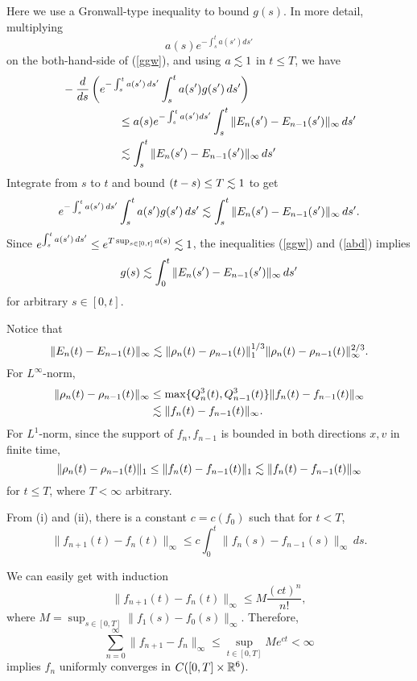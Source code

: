\documentclass[11pt]{amsart}
\begin{document}
\begin{pfs}
Here we use a Gronwall-type inequality to bound $g(s)$.
In more detail, multiplying
\[a(s)e^{-\int_s^ta(s')ds'}\]
on the both-hand-side of (\ref{ggw}), and using $a\lesssim 1$ in $t\le T$, we have
\begin{align*}
&-\dd{s}\left(e^{-\int_s^ta(s')\,ds'}\int_s^ta(s')g(s')\,ds'\right)\\
&\hspace{5em}\le a(s)e^{-\int_s^ta(s')ds'}\int_s^t\|E_n(s')-E_{n-1}(s')\|_\infty\,ds'\\
&\hspace{5em}\les\int_s^t\|E_n(s')-E_{n-1}(s')\|_\infty\,ds'
\end{align*}
Integrate from $s$ to $t$ and bound $(t-s)\le T\lesssim1$ to get
\begin{align}\label{abd}
e^{-\int_s^ta(s')\,ds'}\int_s^ta(s')g(s')\,ds'\lesssim\int_s^t\|E_n(s')-E_{n-1}(s')\|_\infty\,ds'.
\end{align}
Since $e^{\int_s^ta(s')\,ds'}\le e^{T\sup_{s\in[0,t]}a(s)}\lesssim1$, the inequalities (\ref{ggw}) and (\ref{abd}) implies
\begin{align}\label{rii}
g(s)\lesssim\int_0^t\|E_n(s')-E_{n-1}(s')\|_\infty\,ds'
\end{align}
for arbitrary $s\in[0,t]$.

\item
Notice that
\[\|E_n(t)-E_{n-1}(t)\|_\infty\lesssim\|\rho_n(t)-\rho_{n-1}(t)\|_1^{1/3}\|\rho_n(t)-\rho_{n-1}(t)\|_\infty^{2/3}.\]
For $L^\infty$-norm,
\begin{align*}
\|\rho_n(t)-\rho_{n-1}(t)\|_\infty
&\le\max\{Q_n^3(t),Q_{n-1}^3(t)\}\|f_n(t)-f_{n-1}(t)\|_\infty\\
&\lesssim\|f_n(t)-f_{n-1}(t)\|_\infty.
\end{align*}
For $L^1$-norm, since the support of $f_n,f_{n-1}$ is bounded in both directions $x,v$ in finite time,
\[\|\rho_n(t)-\rho_{n-1}(t)\|_1\le\|f_n(t)-f_{n-1}(t)\|_1\lesssim\|f_n(t)-f_{n-1}(t)\|_\infty\]
for $t\le T$, where $T<\infty$ arbitrary.

\item
From (i) and (ii), there is a constant $c=c(f_0)$ such that for $t<T$,
\[\|f_{n+1}(t)-f_n(t)\|_\infty\le c\int_0^t\|f_n(s)-f_{n-1}(s)\|_\infty\,ds.\]

We can easily get with induction
\[\|f_{n+1}(t)-f_n(t)\|_\infty\le M\frac{(ct)^n}{n!},\]
where $M=\sup_{s\in[0,T]}\|f_1(s)-f_0(s)\|_\infty$.
Therefore,
\[\sum_{n=0}^\infty\|f_{n+1}-f_n\|_\infty\le\sup_{t\in[0,T]}Me^{ct}<\infty\]
implies $f_n$ uniformly converges in $C([0,T]\times\mathbb{R}^6)$.


\end{pfs}
\end{document}
